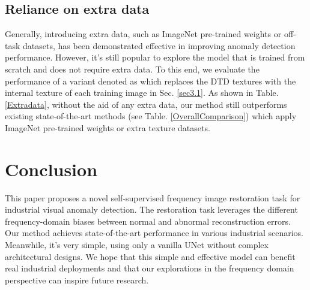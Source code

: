 \documentclass[5p, twocolumn]{elsarticle}[draft]
\begin{document}
\begin{table}[h]
\caption{Quantitative comparison of the anomaly detection performance of our method without using any extra data. I-AUROC and P-AUROC refer to image-level and pixel-level AUROC respectively.}
\end{table}

\subsection{Reliance on extra data}
Generally, introducing extra data, such as ImageNet pre-trained weights or off-task datasets, has been demonstrated effective in improving anomaly detection performance. However, it's still popular to explore the model that is trained from scratch and does not require extra data. To this end, we evaluate the performance of a variant denoted as  which replaces the DTD textures with the internal texture of each training image in Sec. \ref{sec3.1}. As shown in Table. \ref{Extradata}, without the aid of any extra data, our method still outperforms existing state-of-the-art methods (see Table. \ref{OverallComparison}) which apply ImageNet pre-trained weights or extra texture datasets. 

\section{Conclusion}
This paper proposes a novel self-supervised frequency image restoration task for industrial visual anomaly detection. The restoration task leverages the different frequency-domain biases between normal and abnormal reconstruction errors. Our method achieves state-of-the-art performance in various industrial scenarios. Meanwhile, it's very simple, using only a vanilla UNet without complex architectural designs. We hope that this simple and effective model can benefit real industrial deployments and that our explorations in the frequency domain perspective can inspire future research.
\end{document}
